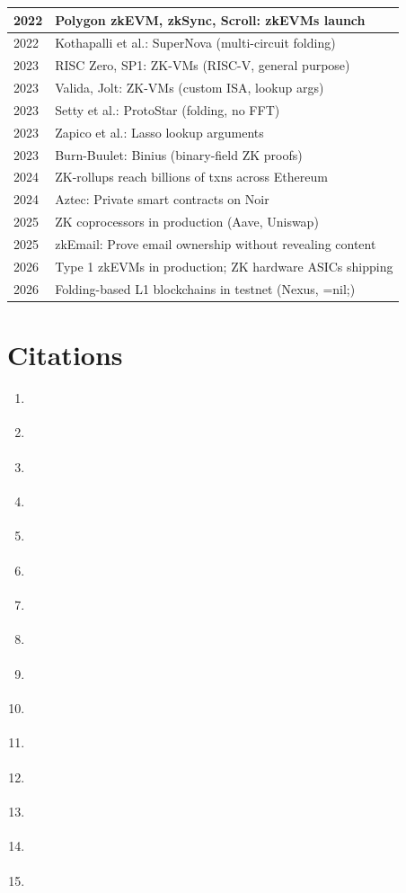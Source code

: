 \begin{tabularx}{\linewidth}{|l|X|}
\hline
2022 & Polygon zkEVM, zkSync, Scroll: zkEVMs launch \\
\hline
2022 & Kothapalli et al.: SuperNova (multi-circuit folding) \\
\hline
2023 & RISC Zero, SP1: ZK-VMs (RISC-V, general purpose) \\
\hline
2023 & Valida, Jolt: ZK-VMs (custom ISA, lookup args) \\
\hline
2023 & Setty et al.: ProtoStar (folding, no FFT) \\
\hline
2023 & Zapico et al.: Lasso lookup arguments \\
\hline
2023 & Burn-Buulet: Binius (binary-field ZK proofs) \\
\hline
2024 & ZK-rollups reach billions of txns across Ethereum \\
\hline
2024 & Aztec: Private smart contracts on Noir \\
\hline
2025 & ZK coprocessors in production (Aave, Uniswap) \\
\hline
2025 & zkEmail: Prove email ownership without revealing content \\
\hline
2026 & Type 1 zkEVMs in production; ZK hardware ASICs shipping \\
\hline
2026 & Folding-based L1 blockchains in testnet (Nexus, =nil;) \\
\hline
\end{tabularx}

\section{Citations}
\label{sec:zk:citations}

\begin{enumerate}
  \item \cite{GoldwasserMicaliRackoff1985}
  \item \cite{GoldreichMicaliWigderson1986}
  \item \cite{FeigeFiatShamir1987}
  \item \cite{BabaiFortnowLund1991}
  \item \cite{Kilian1992}
  \item \cite{Groth2010}
  \item \cite{BenSasson2013}
  \item \cite{BenSasson2018}
  \item \cite{Bunz2018}
  \item \cite{Chiesa2020}
  \item \cite{KothapalliSetty2021}
  \item \cite{Gabizon2019}
  \item \cite{Bowe2019}
  \item \cite{Setty2023}
  \item \cite{Zapico2023}
\end{enumerate}

